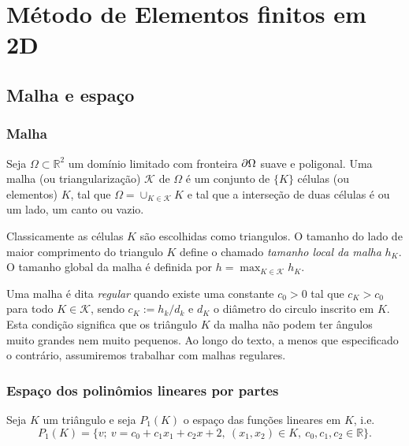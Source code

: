 
\chapter{Método de Elementos finitos em 2D}\label{cap_mef2d}
\thispagestyle{fancy}

\section{Malha e espaço}

\subsection{Malha}

Seja $\Omega\subset \mathbb{R}^2$ um domínio limitado com fronteira $\partial\Omega$ suave e poligonal. Uma malha (ou triangularização) $\mathcal{K}$ de $\Omega$ é um conjunto de $\{K\}$ células (ou elementos) $K$, tal que $\Omega = \cup_{K\in\mathcal{K}}K$ e tal que a interseção de duas células é ou um lado, um canto ou vazio.

Classicamente as células $K$ são escolhidas como triangulos. O tamanho do lado de maior comprimento do triangulo $K$ define o chamado \emph{tamanho local da malha} $h_K$. O tamanho global da malha é definida por $h = \max_{K\in\mathcal{K}} h_K$.

Uma malha é dita \emph{regular} quando existe uma constante $c_0 > 0$ tal que $c_K > c_0$ para todo $K\in\mathcal{K}$, sendo $c_K := h_k/d_k$ e $d_K$ o diâmetro do circulo inscrito em $K$. Esta condição significa que os triângulo $K$ da malha não podem ter ângulos muito grandes nem muito pequenos. Ao longo do texto, a menos que especificado o contrário, assumiremos trabalhar com malhas regulares.

\subsection{Espaço dos polinômios lineares por partes}

Seja $K$ um triângulo e seja $P_1(K)$ o espaço das funções lineares em $K$, i.e.
\begin{equation}
  P_1(K) = \{v;~v=c_0+c_1x_1+c_2x+2,~(x_1,x_2)\in K,~c_0,c_1,c_2\in\mathbb{R}\}.
\end{equation}

